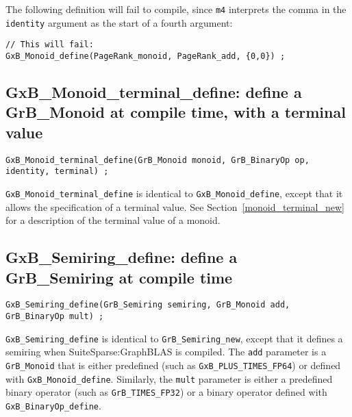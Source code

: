 \documentclass[12pt]{article}
\begin{document}
\noindent
The following definition will fail to compile, since \verb'm4' interprets the
comma in the \verb'identity' argument as the start of a fourth argument:

{\footnotesize
\begin{verbatim}
// This will fail:
GxB_Monoid_define(PageRank_monoid, PageRank_add, {0,0}) ;
\end{verbatim} }

\subsection{{\sf GxB\_Monoid\_terminal\_define:}
define a {\sf GrB\_Monoid} at compile time, with a terminal value}
\label{monoid_terminal_define}

\begin{mdframed}[userdefinedwidth=6in]
{\footnotesize
\begin{verbatim}
GxB_Monoid_terminal_define(GrB_Monoid monoid, GrB_BinaryOp op, identity, terminal) ;
\end{verbatim} } \end{mdframed}

\verb'GxB_Monoid_terminal_define' is identical to \verb'GxB_Monoid_define',
except that it allows the specification of a terminal value.  See
Section~\ref{monoid_terminal_new} for a description of the terminal value of
a monoid.

\subsection{{\sf GxB\_Semiring\_define:}
define a {\sf GrB\_Semiring} at compile time}
\label{semiring_define}

\begin{mdframed}[userdefinedwidth=6in]
{\footnotesize
\begin{verbatim}
GxB_Semiring_define(GrB_Semiring semiring, GrB_Monoid add, GrB_BinaryOp mult) ;
\end{verbatim} } \end{mdframed}

    \verb'GxB_Semiring_define' is identical to \verb'GrB_Semiring_new', except
    that it defines a semiring when SuiteSparse:GraphBLAS is compiled.  The
    \verb'add' parameter is a \verb'GrB_Monoid' that is either predefined (such
    as \verb'GxB_PLUS_TIMES_FP64') or defined with \verb'GxB_Monoid_define'.
    Similarly, the \verb'mult' parameter is either a predefined binary operator
    (such as \verb'GrB_TIMES_FP32') or a binary operator defined with
    \verb'GxB_BinaryOp_define'.
\end{document}
